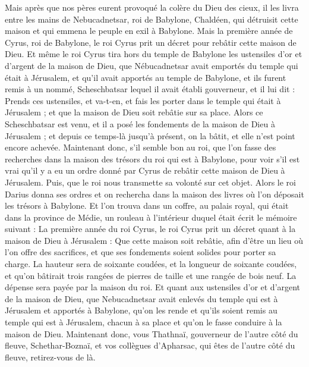 \begin{multicols}{2}
Mais après que nos pères eurent provoqué la colère du Dieu des cieux, il les livra entre les mains de Nebucadnetsar, roi de Babylone, Chaldéen, qui détruisit cette maison et qui emmena le peuple en exil à Babylone.
Mais la première année de Cyrus, roi de Babylone, le roi Cyrus prit un décret pour rebâtir cette maison de Dieu.
Et même le roi Cyrus tira hors du temple de Babylone les ustensiles d'or et d'argent de la maison de Dieu, que Nébucadnetsar avait emportés du temple qui était à Jérusalem, et qu'il avait apportés au temple de Babylone, et ils furent remis à un nommé, Scheschbatsar lequel il avait établi gouverneur,
et il lui dit : Prends ces ustensiles, et va-t-en, et fais les porter dans le temple qui était à Jérusalem ; et que la maison de Dieu soit rebâtie sur sa place.
Alors ce Scheschbatsar est venu, et il a posé les fondements de la maison de Dieu à Jérusalem ; et depuis ce temps-là jusqu'à présent, on la bâtit, et elle n'est point encore achevée.
Maintenant donc, s'il semble bon au roi, que l'on fasse des recherches dans la maison des trésors du roi qui est à Babylone, pour voir s'il est vrai qu'il y a eu un ordre donné par Cyrus de rebâtir cette maison de Dieu à Jérusalem. Puis, que le roi nous transmette sa volonté sur cet objet.
\VerseOne{}Alors le roi Darius donna ses ordres et on rechercha dans la maison des livres où l'on déposait les trésors à Babylone.
Et l'on trouva dans un coffre, au palais royal, qui était dans la province de Médie, un rouleau à l'intérieur duquel était écrit le mémoire suivant :
La première année du roi Cyrus, le roi Cyrus prit un décret quant à la maison de Dieu à Jérusalem : Que cette maison soit rebâtie, afin d'être un lieu où l'on offre des sacrifices, et que ses fondements soient solides pour porter sa charge. La hauteur sera de soixante coudées, et la longueur de soixante coudées,
et qu'on bâtirait trois rangées de pierres de taille et une rangée de bois neuf. La dépense sera payée par la maison du roi.
Et quant aux ustensiles d'or et d'argent de la maison de Dieu, que Nebucadnetsar avait enlevés du temple qui est à Jérusalem et apportés à Babylone, qu'on les rende et qu'ils soient remis au temple qui est à Jérusalem, chacun à sa place et qu'on le fasse conduire à la maison de Dieu.
Maintenant donc, vous Thathnaï, gouverneur de l'autre côté du fleuve, Schethar-Boznaï, et vos collègues d'Apharsac, qui êtes de l'autre côté du fleuve, retirez-vous de là.

\end{multicols}
